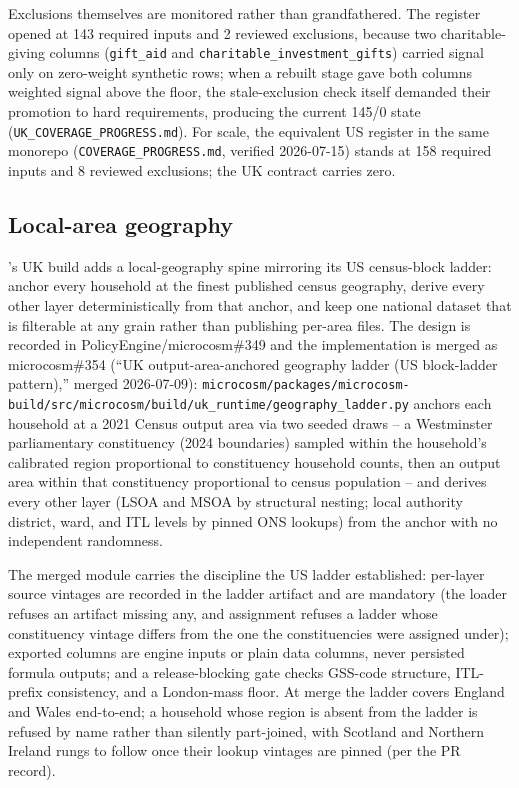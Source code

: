 Exclusions themselves are monitored rather than grandfathered. The
register opened at 143 required inputs and 2 reviewed exclusions, because
two charitable-giving columns (\texttt{gift\_aid} and
\texttt{charitable\_investment\_gifts}) carried signal only on zero-weight
synthetic rows; when a rebuilt \spi{} stage gave both columns weighted
signal above the floor, the stale-exclusion check itself demanded their
promotion to hard requirements, producing the current 145/0 state
(\texttt{UK\_COVERAGE\_PROGRESS.md}). For scale, the equivalent US
register in the same monorepo (\texttt{COVERAGE\_PROGRESS.md}, verified
2026-07-15) stands at 158 required inputs and 8 reviewed exclusions; the
UK contract carries zero.

\subsection{Local-area geography}
\label{sec:data-geography}

\microcosm{}'s UK build adds a local-geography spine mirroring its US
census-block ladder: anchor every household at the finest published census
geography, derive every other layer deterministically from that anchor,
and keep one national dataset that is filterable at any grain rather than
publishing per-area files. The design is recorded in
PolicyEngine/microcosm\#349 and the implementation is merged as
microcosm\#354 (``UK output-area-anchored geography ladder (US
block-ladder pattern),'' merged 2026-07-09):
\texttt{microcosm/packages/microcosm-build/src/microcosm/build/uk\_runtime/geography\_ladder.py}
anchors each household at a 2021 Census output area via two seeded draws
-- a Westminster parliamentary constituency (2024 boundaries) sampled
within the household's calibrated region proportional to constituency
household counts, then an output area within that constituency
proportional to census population -- and derives every other layer (LSOA
and MSOA by structural nesting; local authority district, ward, and ITL
levels by pinned ONS lookups) from the anchor with no independent
randomness.

The merged module carries the discipline the US ladder established:
per-layer source vintages are recorded in the ladder artifact and are
mandatory (the loader refuses an artifact missing any, and assignment
refuses a ladder whose constituency vintage differs from the one the
constituencies were assigned under); exported columns are engine inputs or
plain data columns, never persisted formula outputs; and a
release-blocking gate checks GSS-code structure, ITL-prefix consistency,
and a London-mass floor. At merge the ladder covers England and Wales
end-to-end; a household whose region is absent from the ladder is refused
by name rather than silently part-joined, with Scotland and Northern
Ireland rungs to follow once their lookup vintages are pinned (per the PR
record). 


